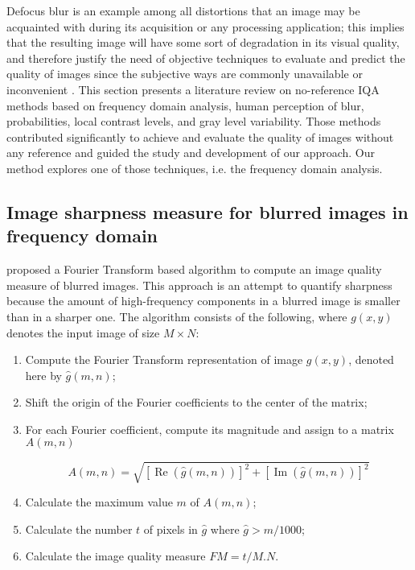 Defocus blur is an example among all distortions that an image may be acquainted with during its acquisition or any processing application; this implies that the resulting image will have some sort of degradation in its visual quality, and therefore justify the need of objective techniques to evaluate and predict the quality of images since the subjective ways are commonly unavailable or inconvenient \cite{wang2004image}. This section presents a literature review on no-reference IQA methods based on frequency domain analysis, human perception of blur, probabilities, local contrast levels, and gray level variability. Those methods contributed significantly to achieve and evaluate the quality of images without any reference and guided the study and development of our approach. Our method explores one of those techniques, i.e. the frequency domain analysis.

\subsection{Image sharpness measure for blurred images in frequency domain}

 proposed a Fourier Transform based algorithm to compute an image quality measure of blurred images. This approach is an attempt to quantify sharpness because the amount of high-frequency components in a blurred image is smaller than in a sharper one. The algorithm consists of the following, where $g(x,y)$ denotes the input image of size $M \times N$:

\begin{enumerate}[label=\Roman* -]
    \item Compute the Fourier Transform representation of image $g(x,y)$, denoted here by $\hat{g}(m,n)$;
    
    \item Shift the origin of the Fourier coefficients to the center of the matrix;
    
    \item For each Fourier coefficient, compute its magnitude and assign to a matrix $A(m,n)$
    
    \begin{equation*}
        A(m,n) = \sqrt{
            [\operatorname{Re}{(\hat{g}(m,n))}]^{2}
            + [\operatorname{Im}{(\hat{g}(m,n))}]^{2}
          }
    \end{equation*}
    
    \item  Calculate the maximum value $m$ of $A(m,n)$; 
    
    \item Calculate the number $t$ of pixels in $\hat{g}$ where $\hat{g} > m /1000$;
    
    \item Calculate the image quality measure $FM = t /M.N$.
\end{enumerate}

